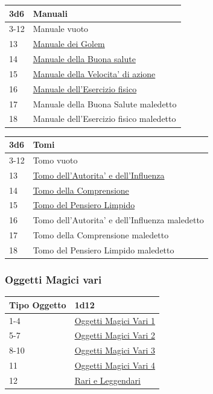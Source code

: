 \begin{multicols}{2}
{\noindent\begin{tabularx}{\linewidth}{ll}
	\toprule
\rowcolor{gray!20}\textbf{3d6} & \textbf{Manuali}\\
\toprule
3-12 & Manuale vuoto\\
\rowcolor{gray!20}13 & \hyperlink{Manuale dei Golem}{Manuale dei Golem}\\
14 & \hyperlink{Manuale della Buonasalute}{Manuale della Buona salute}\\
\rowcolor{gray!20}15 & \hyperlink{Manuale della Velocita' di azione}{Manuale della Velocita' di azione}\\
16 & \hyperlink{Manuale dell'Esercizio fisico}{Manuale dell'Esercizio fisico}\\
\rowcolor{gray!20}17 & Manuale della Buona Salute maledetto\\
18 & Manuale dell'Esercizio fisico maledetto
\end{tabularx}

\medskip\hypertarget{Tomi}{}

{\small\begin{tabularx}{\linewidth}{ll}
		\toprule
\rowcolor{gray!20}\textbf{3d6} & \textbf{Tomi}\\
\toprule
3-12 & Tomo vuoto\\
\rowcolor{gray!20}13 & \hyperlink{Tomo dell'Autorita' e dell'Influenza}{Tomo dell'Autorita' e dell'Influenza}\\
14 & \hyperlink{Tomo della Comprensione}{Tomo della Comprensione}\\
\rowcolor{gray!20}15 & \hyperlink{Tomo del Pensiero Limpido}{Tomo del Pensiero Limpido}\\
16 & Tomo dell'Autorita' e dell'Influenza maledetto\\
\rowcolor{gray!20}17 & Tomo della Comprensione maledetto\\
18 & Tomo del Pensiero Limpido maledetto
\end{tabularx}}

\subsubsection{Oggetti Magici vari}\hypertarget{oggettimagicivari}{}\label{oggettimagicivari}

{\small\begin{tabularx}{\linewidth}{ll}
		\toprule
\rowcolor{gray!20}\textbf{Tipo Oggetto} & \textbf{1d12}\\
\toprule
1-4 & \hyperlink{Oggetti Magici Vari 1}{Oggetti Magici Vari 1}\\
\rowcolor{gray!20}5-7 & \hyperlink{Oggetti Magici Vari 2}{Oggetti Magici Vari 2}\\
8-10&\hyperlink{Oggetti Magici Vari 3}{Oggetti Magici Vari 3}\\
\rowcolor{gray!20}11  &\hyperlink{Oggetti Magici Vari 4}{Oggetti Magici Vari 4}\\
12  &\hyperlink{Rari e Leggendari}{Rari e Leggendari}
\end{tabularx}}

}
\end{multicols}
